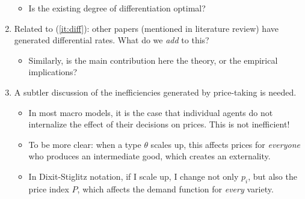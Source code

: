 \documentclass[11pt]{article}
\begin{document}
\begin{enumerate}
    \begin{itemize}
        \item Is the existing degree of differentiation optimal? 
    \end{itemize} 
    \item Related to (\ref{it:diff}): other papers (mentioned in literature review) have generated differential rates. What do we \textit{add} to this? 
    \begin{itemize}
        \item Similarly, is the main contribution here the theory, or the empirical implications? 
    \end{itemize} 
    \item A subtler discussion of the inefficiencies generated by price-taking is needed. 
    \begin{itemize}
        \item In most macro models, it is the case that individual agents do not internalize the effect of their decisions on prices. This is not inefficient!
        \item To be more clear: when a type \( \theta \) scales up, this affects prices for \textit{everyone} who produces an intermediate good, which creates an externality. 
        \item In Dixit-Stiglitz notation, if I scale up, I change not only \( p_i \), but also the price index \( P \), which affects the demand function for \textit{every} variety. 
    \end{itemize}
\end{enumerate}
\end{document}
